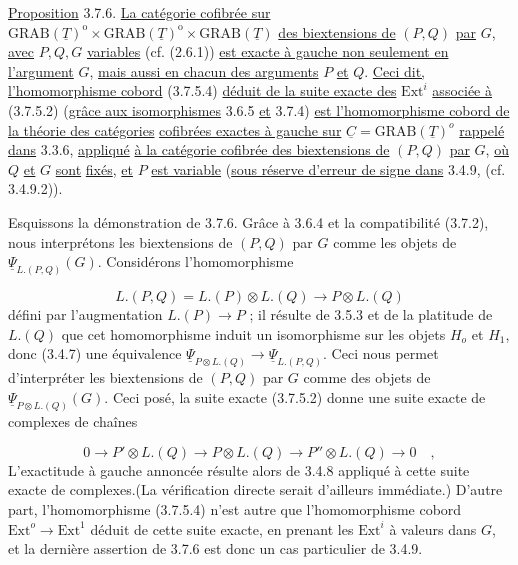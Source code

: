 \underline{Proposition} 3.7.6. \underline{La catégorie cofibrée sur} $\mathrm{GRAB}(\underline{T})^{\mathrm{o}} \times \mathrm{GRAB}(\underline{T})^{\mathrm{o}} \times \mathrm{GRAB}(\underline{T})$ \underline{des biextensions de} $(P,Q)$ \underline{par} $G$, \underline{avec} $P,Q,G$ \underline{variables} (cf. (2.6.1)) \underline{est exacte à gauche non seulement en l'argument} $G$, \underline{mais aussi en chacun des arguments} $P$ \underline{et} $Q$. \underline{Ceci dit,} \underline{l'homomorphisme cobord} (3.7.5.4) \underline{déduit de la suite exacte des} $\mathrm{Ext}^{i}$ \underline{associée à} (3.7.5.2) (\underline{grâce aux isomorphismes} 3.6.5 \underline{et} 3.7.4) \underline{est l'homomorphisme cobord de la théorie des catégories}
\underline{cofibrées exactes à gauche sur} $\underline{C} = \mathrm{GRAB}(\underline{T})^{o}$ \underline{rappelé dans} 3.3.6, \underline{appliqué} \underline{à la catégorie cofibrée des biextensions de} $(P,Q)$ \underline{par} $G$, \underline{où} $Q$ \underline{et} $G$ \underline{sont} \underline{fixés}, \underline{et} $P$ \underline{est variable} (\underline{sous réserve d'erreur de signe dans} 3.4.9, (cf. 3.4.9.2)).

Esquissons la démonstration de 3.7.6. Grâce à 3.6.4 et la compatibilité (3.7.2), nous interprétons les biextensions de $(P,Q)$ par $G$ comme les objets de $\underline{\Psi}_{L.(P,Q)}(G)$. Considérons l'homomorphisme

\begin{equation*}
L.(P,Q)=L.(P) \otimes L.(Q) \longrightarrow P \otimes L.(Q)
\end{equation*}
défini par l'augmentation $L.(P) \longrightarrow P$ ; il résulte de 3.5.3 et de la platitude de $L.(Q)$ que cet homomorphisme induit un isomorphisme sur les objets $H_o$ et $H_1$, donc (3.4.7) une équivalence $\underline{\Psi}_{P \otimes L.(Q)} \longrightarrow \underline{\Psi}_{L.(P,Q)}$. Ceci nous permet d'interpréter les biextensions de $(P,Q)$ par $G$ comme des objets de $\underline{\Psi}_{P \otimes L.(Q)}(G)$. Ceci posé, la suite exacte (3.7.5.2) donne une suite exacte de complexes de chaînes

\begin{equation}\tag{3.7.6.1}
0 \longrightarrow P' \otimes L.(Q) \longrightarrow P \otimes L.(Q) \longrightarrow P'' \otimes L.(Q) \longrightarrow 0 \quad ,
\end{equation}
L'exactitude à gauche annoncée résulte alors de 3.4.8 appliqué à cette suite exacte de complexes.(La vérification directe serait d'ailleurs immédiate.) D'autre part, l'homomorphisme (3.7.5.4) n'est autre que l'homomorphisme cobord $\mathrm{Ext}^{o} \longrightarrow \mathrm{Ext}^{1}$ déduit de cette suite exacte, en prenant les $\mathrm{Ext}^{i}$ à valeurs dans $G$, et la dernière assertion de 3.7.6 est donc un cas particulier de 3.4.9.


